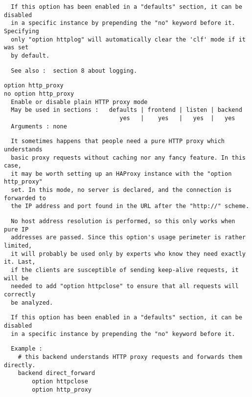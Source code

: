 \begin{verbatim}
  If this option has been enabled in a "defaults" section, it can be disabled
  in a specific instance by prepending the "no" keyword before it. Specifying
  only "option httplog" will automatically clear the 'clf' mode if it was set
  by default.
\end{verbatim}

\begin{verbatim}
  See also :  section 8 about logging.
\end{verbatim}

\begin{verbatim}
option http_proxy
no option http_proxy
  Enable or disable plain HTTP proxy mode
  May be used in sections :   defaults | frontend | listen | backend
                                 yes   |    yes   |   yes  |   yes
  Arguments : none
\end{verbatim}

\begin{verbatim}
  It sometimes happens that people need a pure HTTP proxy which understands
  basic proxy requests without caching nor any fancy feature. In this case,
  it may be worth setting up an HAProxy instance with the "option http_proxy"
  set. In this mode, no server is declared, and the connection is forwarded to
  the IP address and port found in the URL after the "http://" scheme.
\end{verbatim}

\begin{verbatim}
  No host address resolution is performed, so this only works when pure IP
  addresses are passed. Since this option's usage perimeter is rather limited,
  it will probably be used only by experts who know they need exactly it. Last,
  if the clients are susceptible of sending keep-alive requests, it will be
  needed to add "option httpclose" to ensure that all requests will correctly
  be analyzed.
\end{verbatim}

\begin{verbatim}
  If this option has been enabled in a "defaults" section, it can be disabled
  in a specific instance by prepending the "no" keyword before it.
\end{verbatim}

\begin{verbatim}
  Example :
    # this backend understands HTTP proxy requests and forwards them directly.
    backend direct_forward
        option httpclose
        option http_proxy
\end{verbatim}


